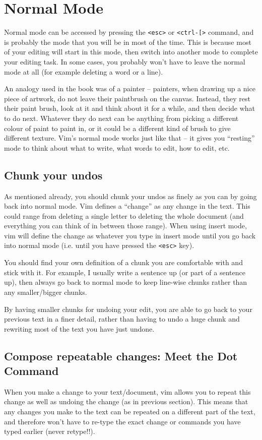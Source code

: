 \section{Normal Mode}

Normal mode can be accessed by pressing  the \verb|<esc>| or \verb|<ctrl-[>| command, and is probably the mode that you will be in most of the time.
This is because most of your editing will start in this mode, then switch into another mode to complete your editing task.
In some cases, you probably won't have to leave the normal mode at all (for example deleting a word or a line).

An analogy used in the book was of a painter -- painters, when drawing up a nice piece of artwork, do not leave their paintbrush on the canvas.
Instead, they rest their paint brush, look at it and think about it for a while, and then decide what to do next.
Whatever they do next can be anything from picking a different colour of paint to paint in, or it could be a different kind of brush to give different texture.
Vim's normal mode works just like that -- it gives you ``resting'' mode to think about what to write, what words to edit, how to edit, etc.

\subsection{Chunk your undos}

As mentioned already, you should chunk your undos as finely as you can by going back into normal mode.
Vim defines a ``change'' as any change in the text.
This could range from deleting a single letter to deleting the whole document (and everything you can think of in between those range).
When using insert mode, vim will define the change as whatever you type in insert mode until you go back into normal mode (i.e. until you have pressed the \verb|<esc>| key).

You should find your own definition of a chunk you are comfortable with and stick with it.
For example, I usually write a sentence up (or part of a sentence up), then always go back to normal mode to keep line-wise chunks rather than any smaller/bigger chunks.

By having smaller chunks for undoing your edit, you are able to go back to your previous text in a finer detail, rather than having to undo a huge chunk and rewriting most of the text you have just undone.

\subsection{Compose repeatable changes: Meet the Dot Command}

When you make a change to your text/document, vim allows you to repeat this change as well as undoing the change (as in previous section).
This means that any changes you make to the text can be repeated on a different part of the text, and therefore won't have to re-type the exact change or commands you have typed earlier (never retype!!).












